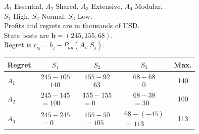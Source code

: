 {\noindent\begin{minipage}[t]{0.46\textwidth}
  \vspace{0pt}
  $A_1$ Essential, $A_2$ Shared, $A_3$ Extensive, $A_4$ Modular.\\
  $S_1$ High, $S_2$ Normal, $S_3$ Low.\\
  Profits and regrets are in thousands of USD.\\
  State bests are $\boldsymbol{b}=(245,155,68)$.\\
  Regret is $r_{ij}=b_j-P_{ay}(A_i,S_j)$.
\end{minipage}\hfill
\begin{minipage}[t]{0.51\textwidth}
  \vspace{0pt}\centering
  \setlength{\tabcolsep}{3pt}
  \renewcommand{\arraystretch}{1.2}
  \begin{tabular}{@{}lcccc@{}}
    \toprule
    Regret & $S_1$ & $S_2$ & $S_3$ & Max.\\ \midrule
    $A_1$ & $\begin{gathered}245-105\\=140\end{gathered}$ & $\begin{gathered}155-92\\=63\end{gathered}$ & $\begin{gathered}68-68\\=0\end{gathered}$ & 140\\
    $A_2$ & $\begin{gathered}245-145\\=100\end{gathered}$ & $\begin{gathered}155-155\\=0\end{gathered}$ & $\begin{gathered}68-38\\=30\end{gathered}$ & 100\\
    $A_3$ & $\begin{gathered}245-245\\=0\end{gathered}$ & $\begin{gathered}155-50\\=105\end{gathered}$ & $\begin{gathered}68-(-45)\\=113\end{gathered}$ & 113\\

\end{tabular}
\end{minipage}}

